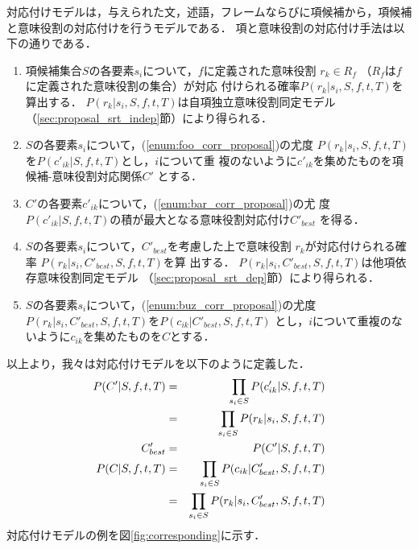 \documentclass[japanese]{jnlp_1.2b}
\begin{document}
対応付けモデルは，与えられた文，述語，フレームならびに項候補から，項候補
と意味役割の対応付けを行うモデルである．
項と意味役割の対応付け手法は以下の通りである．

\begin{enumerate}
 \item 項候補集合$S$の各要素$s_{i}$について，$f$に定義された意味役割
       $r_{k} \in R_{f}$ （$R_{f}$は$f$に定義された意味役割の集合）が対応
       付けられる確率$P(r_{k}|s_{i},S,f,t,T)$を算出する．
       $P(r_{k}|s_{i},S,f,t,T)$は自項独立意味役割同定モデル
       （\ref{sec:proposal_srt_indep}節）により得られる．
       \label{enum:foo_corr_proposal}
 \item $S$の各要素$s_{i}$について，(\ref{enum:foo_corr_proposal})の尤度
       $P(r_{k}|s_{i},S,f,t,T)$を$P(c'_{ik}|S,f,t,T)$とし，$i$について重
       複のないように$c'_{ik}$を集めたものを項候補-意味役割対応関係$C'$
       とする．
       \label{enum:bar_corr_proposal}
 \item $C'$の各要素$c'_{ik}$について，(\ref{enum:bar_corr_proposal})の尤
       度$P(c'_{ik}|S,f,t,T)$の積が最大となる意味役割対応付け$C'_{best}$
       を得る．
 \item $S$の各要素$s_{i}$について，$C'_{best}$を考慮した上で意味役割
       $r_{k}$が対応付けられる確率\linebreak
	$P(r_{k}|s_{i},C'_{best},S,f,t,T)$を算
       出する．
       $P(r_{k}|s_{i},C'_{best},S,f,t,T)$は他項依存意味役割同定モデル
       （\ref{sec:proposal_srt_dep}節）により得られる．
       \label{enum:buz_corr_proposal}
 \item $S$の各要素$s_{i}$について，(\ref{enum:buz_corr_proposal})の尤度
       $P(r_{k}|s_{i},C'_{best},S,f,t,T)$を$P(c_{ik}|C'_{best},S,f,t,T)$
       とし，$i$について重複のないように$c_{ik}$を集めたものを$C$とする．
\end{enumerate}
以上より，我々は対応付けモデルを以下のように定義した．
\begin{eqnarray}
 \label{eqn:corresponding0_proposal}
 P(C'|S,f,t,T) & = & \prod_{s_i \in S}{P(c'_{ik}|S, f, t, T)}
 \nonumber \\
               & = & \prod_{s_i \in S}{P(r_{k}|s_{i}, S, f, t, T)} \\
 \label{eqn:corresponding1_proposal}
  C'_{best}    & = & \argmax{C'}{P(C'|S,f,t,T)} \\
 \label{eqn:corresponding2_proposal}
 P(C|S,f,t,T)  & = & \prod_{s_i \in S}{P(c_{ik}|C'_{best}, S, f, t, T)}
 \nonumber \\
               & = & \prod_{s_i \in S}{P(r_{k}|s_{i}, C'_{best}, S, f,
		t, T)}
\end{eqnarray}
対応付けモデルの例を図\ref{fig:corresponding}に示す．
\end{document}
